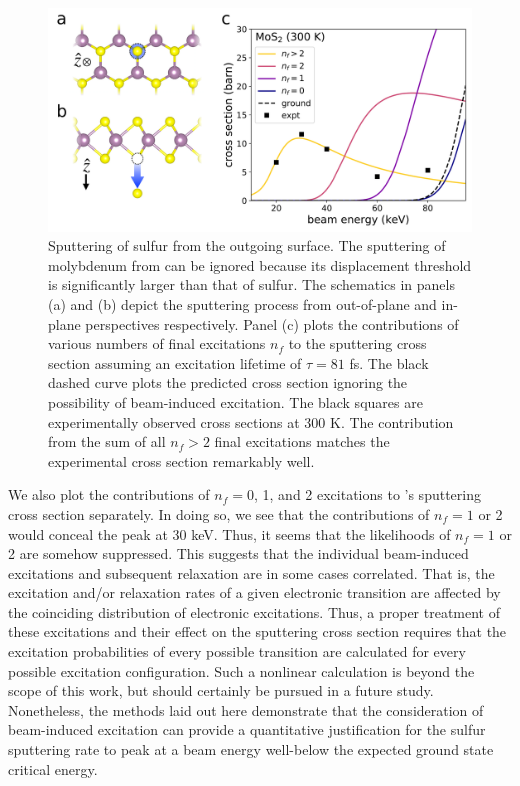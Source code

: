 \documentclass[twoside,twocolumn,9pt]{article}
\begin{document}
\begin{figure}
  \centering
  \includegraphics[width=.85\textwidth]{figures/MoS2Cross.pdf}
  \caption{
    Sputtering of sulfur from the outgoing  surface.
    The sputtering of molybdenum from  can be ignored because its
    displacement threshold is significantly larger than that of sulfur.
    The schematics in panels (a) and (b) depict the sputtering process from
    out-of-plane and in-plane perspectives respectively.
    Panel (c) plots the contributions of various numbers of final excitations
    $n_f$ to the sputtering cross section assuming an excitation lifetime of
    $\tau=81$ fs.
    The black dashed curve plots the predicted cross section ignoring the
    possibility of beam-induced excitation.
    The black squares are experimentally observed cross sections at 300 K.
    \cite{Kretschmer2020}
    The contribution from the sum of all $n_f>2$ final excitations matches
    the experimental cross section remarkably well.
  }
  \label{fig:MoS2Cross}
\end{figure}

We also plot the contributions of $n_f = 0$, 1, and 2 excitations to 's
sputtering cross section separately.
In doing so, we see that the contributions of $n_f = 1$ or 2 would conceal the
peak at 30 keV. 
Thus, it seems that the likelihoods of $n_f = 1$ or 2 are somehow suppressed.
This suggests that the individual beam-induced excitations and subsequent
relaxation are in some cases correlated.  That is, the excitation and/or
relaxation rates of a given electronic transition are affected by the
coinciding distribution of electronic excitations.
Thus, a proper treatment of these excitations and their effect on the sputtering
cross section requires that the excitation probabilities of every possible
transition are calculated for every possible excitation configuration.
Such a nonlinear calculation is beyond the scope of this work, but
should certainly be pursued in a future study.
Nonetheless, the methods laid out here demonstrate that the consideration of
beam-induced excitation can provide a quantitative justification for the sulfur
sputtering rate to peak at a beam energy well-below the expected ground state
critical energy.
\end{document}

